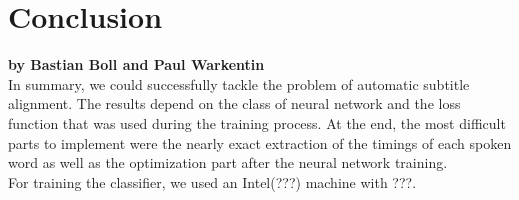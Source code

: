 \chapter{Conclusion}

\textbf{by Bastian Boll and Paul Warkentin} \\

In summary, we could successfully tackle the problem of automatic subtitle alignment. The results depend on the class of neural network and the loss function that was used during the training process. At the end, the most difficult parts to implement were the nearly exact extraction of the timings of each spoken word as well as the optimization part after the neural network training. \\

For training the classifier, we used an Intel(???) machine with ???.
